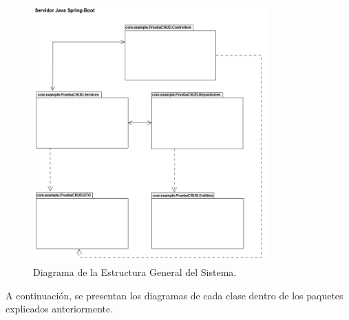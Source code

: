 \begin{figure}[htbp!]
	\begin{center}
		\includegraphics[width=0.8\textwidth]{Clases/DCG}
		\caption{Diagrama de la Estructura General del Sistema.}
		\label{fig:DCG}
	\end{center}
\end{figure}

A continuación, se presentan los diagramas de cada clase dentro de los paquetes explicados anteriormente.


